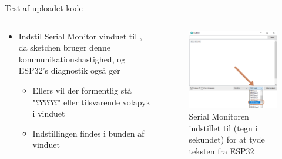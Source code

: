 \documentclass[aspectratio=169]{beamer}
\begin{document}
\begin{frame}{Test af uploadet kode}
\begin{columns}
	
	\begin{column}{0.5\textwidth}
		\begin{textBox}
			\begin{itemize}
				\item Indstil Serial Monitor vinduet til , da sketchen bruger denne kommunikationshastighed, og ESP32's diagnostik også gør
				\begin{itemize}
					\item Ellers vil der formentlig stå "⸮⸮⸮⸮⸮⸮" eller tilsvarende volapyk i vinduet
					\item Indstillingen findes i bunden af vinduet
				\end{itemize}
			\end{itemize}
		\end{textBox}
	\end{column}
	
	\begin{column}{0.5\textwidth}
		\begin{figure}
  			\includegraphics[height=0.6\textheight,keepaspectratio=true]{assets/pictures/serial-monitor-115200-baud.png}
  			\caption{Serial Monitoren indstillet til  (tegn i sekundet) for at tyde teksten fra ESP32}
  			\label{fig:serial-monitor-115200-baud}
		\end{figure}
	\end{column}

\end{columns}
\end{frame}
\end{document}
